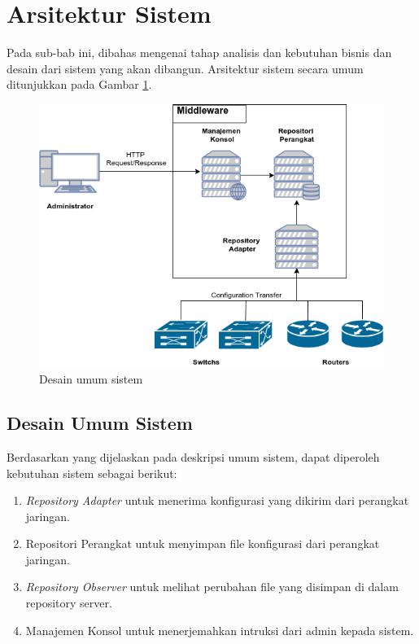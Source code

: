	\section{Arsitektur Sistem}
		Pada sub-bab ini, dibahas mengenai tahap analisis dan kebutuhan bisnis dan desain dari sistem yang akan dibangun. Arsitektur sistem secara umum ditunjukkan pada Gambar \ref{DesainUmumSistem}.\\
		\begin{figure}[H]
			\centering
			\includegraphics[width=\textwidth]{Images/C-3/Desain-Umum-TA-4.png}
			\caption{Desain umum sistem}
			\label{DesainUmumSistem}
		\end{figure}

		\subsection{Desain Umum Sistem}
			Berdasarkan yang dijelaskan pada deskripsi umum sistem, dapat diperoleh kebutuhan sistem sebagai berikut:
			\begin{enumerate}
				\item \textit{Repository Adapter} untuk menerima konfigurasi yang dikirim dari perangkat jaringan.
				\item Repositori Perangkat untuk menyimpan file konfigurasi dari perangkat jaringan.
				\item \textit{Repository Observer} untuk melihat perubahan file yang disimpan di dalam repository server.
				\item Manajemen Konsol untuk menerjemahkan intruksi dari admin kepada sistem.
			\end{enumerate}
                
